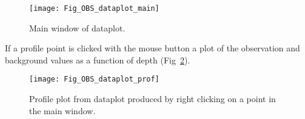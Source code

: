 \documentclass[NEMO_book]{subfiles}
\begin{document}
\begin{figure}     \begin{center}
\texttt{[image: Fig\_OBS\_dataplot\_main]}
\caption{      \label{fig:obsdataplotmain}
Main window of dataplot.}
\end{center}     \end{figure}

If a profile point is clicked with the mouse button a plot of the observation and background
values as a function of depth (Fig~\ref{fig:obsdataplotprofile}).

\begin{figure}     \begin{center}
\texttt{[image: Fig\_OBS\_dataplot\_prof]}
\caption{      \label{fig:obsdataplotprofile}
Profile plot from dataplot produced by right clicking on a point in the main window.}
\end{center}     \end{figure}
\end{document}
